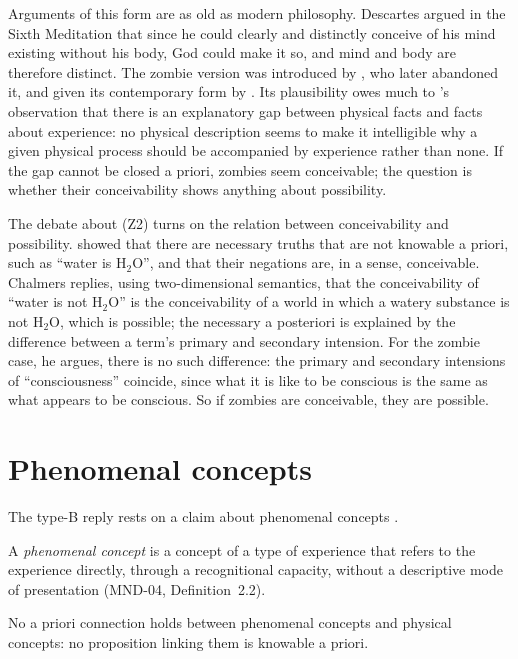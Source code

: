 \documentclass{situationist-preprint}
\begin{document}
Arguments of this form are as old as modern philosophy. Descartes argued in the Sixth Meditation that since he could clearly and distinctly conceive of his mind existing without his body, God could make it so, and mind and body are therefore distinct. The zombie version was introduced by \citet{Kirk1974}, who later abandoned it, and given its contemporary form by \citet{Chalmers1996}. Its plausibility owes much to \citet{Levine1983}'s observation that there is an explanatory gap between physical facts and facts about experience: no physical description seems to make it intelligible why a given physical process should be accompanied by experience rather than none. If the gap cannot be closed a priori, zombies seem conceivable; the question is whether their conceivability shows anything about possibility.

The debate about (Z2) turns on the relation between conceivability and possibility. \citet{Kripke1980} showed that there are necessary truths that are not knowable a priori, such as \enquote{water is H$_2$O}, and that their negations are, in a sense, conceivable. Chalmers replies, using two-dimensional semantics, that the conceivability of \enquote{water is not H$_2$O} is the conceivability of a world in which a watery substance is not H$_2$O, which is possible; the necessary a posteriori is explained by the difference between a term's primary and secondary intension. For the zombie case, he argues, there is no such difference: the primary and secondary intensions of \enquote{consciousness} coincide, since what it is like to be conscious is the same as what appears to be conscious. So if zombies are conceivable, they are possible.

\section{Phenomenal concepts}

The type-B reply rests on a claim about phenomenal concepts \citep{Loar1990,Papineau2002,Balog1999}.

\begin{definition}\label{d:phen}
A \emph{phenomenal concept} is a concept of a type of experience that refers to the experience directly, through a recognitional capacity, without a descriptive mode of presentation (MND-04, Definition~2.2).
\end{definition}

\begin{assumption}\label{a:iso}
No a priori connection holds between phenomenal concepts and physical concepts: no proposition linking them is knowable a priori.
\end{assumption}
\end{document}

